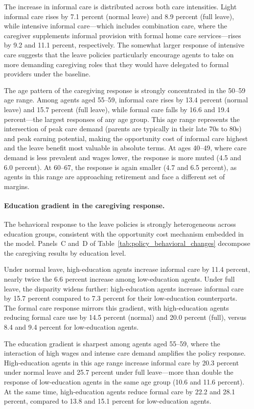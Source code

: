 The increase in informal care is distributed across both care intensities. Light informal care rises by 7.1 percent (normal leave) and 8.9 percent (full leave), while intensive informal care---which includes combination care, where the caregiver supplements informal provision with formal home care services---rises by 9.2 and 11.1 percent, respectively. The somewhat larger response of intensive care suggests that the leave policies particularly encourage agents to take on more demanding caregiving roles that they would have delegated to formal providers under the baseline.

The age pattern of the caregiving response is strongly concentrated in the 50--59 age range. Among agents aged 55--59, informal care rises by 13.4 percent (normal leave) and 15.7 percent (full leave), while formal care falls by 16.6 and 19.4 percent---the largest responses of any age group. This age range represents the intersection of peak care demand (parents are typically in their late 70s to 80s) and peak earning potential, making the opportunity cost of informal care highest and the leave benefit most valuable in absolute terms. At ages 40--49, where care demand is less prevalent and wages lower, the response is more muted (4.5 and 6.0 percent). At 60--67, the response is again smaller (4.7 and 6.5 percent), as agents in this range are approaching retirement and face a different set of margins.

\paragraph{Education gradient in the caregiving response.} The behavioral response to the leave policies is strongly heterogeneous across education groups, consistent with the opportunity cost mechanism embedded in the model. Panels~C and~D of Table~\ref{tab:policy_behavioral_changes} decompose the caregiving results by education level.

Under normal leave, high-education agents increase informal care by 11.4 percent, nearly twice the 6.6 percent increase among low-education agents. Under full leave, the disparity widens further: high-education agents increase informal care by 15.7 percent compared to 7.3 percent for their low-education counterparts. The formal care response mirrors this gradient, with high-education agents reducing formal care use by 14.5 percent (normal) and 20.0 percent (full), versus 8.4 and 9.4 percent for low-education agents.

The education gradient is sharpest among agents aged 55--59, where the interaction of high wages and intense care demand amplifies the policy response. High-education agents in this age range increase informal care by 20.3 percent under normal leave and 25.7 percent under full leave---more than double the response of low-education agents in the same age group (10.6 and 11.6 percent). At the same time, high-education agents reduce formal care by 22.2 and 28.1 percent, compared to 13.8 and 15.1 percent for low-education agents.

